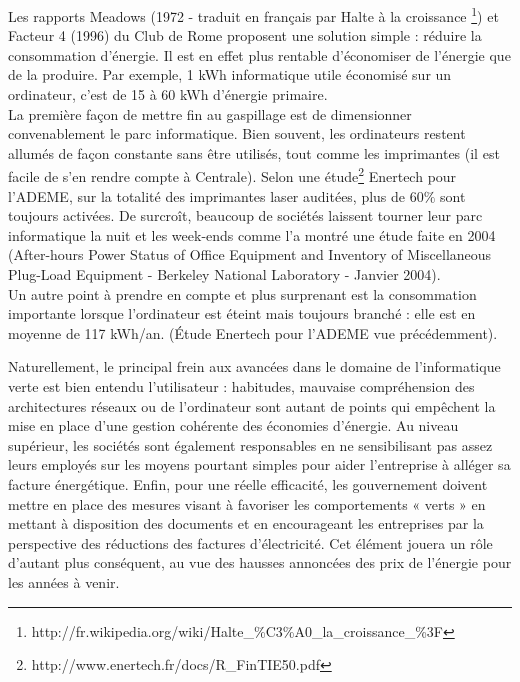 \documentclass[a4paper,11pt,french]{article}
\begin{document}
Les rapports Meadows (1972 - traduit en français par \og Halte à la croissance \fg \footnote{\textsf{http://fr.wikipedia.org/wiki/Halte\_{}\%C3\%A0\_{}la\_{}croissance\_{}\%3F}}) et Facteur 4 (1996) du Club de Rome proposent une solution simple : réduire la consommation d’énergie. Il est en effet plus rentable d’économiser de l’énergie que de la produire. Par exemple, 1 kWh informatique utile économisé sur un ordinateur, c’est de 15 à 60 kWh d’énergie primaire.\\

La première façon de mettre fin au gaspillage est de dimensionner convenablement le parc informatique. Bien souvent, les ordinateurs restent allumés de façon constante sans être utilisés, tout comme les imprimantes (il est facile de s’en rendre compte à Centrale). Selon une étude\footnote{\textsf{http://www.enertech.fr/docs/R\_{}FinTIE50.pdf}} Enertech pour l’ADEME, sur la totalité des imprimantes laser auditées, plus de $60\%$ sont toujours activées. De surcroît, beaucoup de sociétés laissent tourner leur parc informatique la nuit et les week-ends comme l’a montré une étude faite en 2004 (After-hours Power Status of Office Equipment and Inventory of Miscellaneous Plug-Load Equipment - Berkeley National Laboratory - Janvier 2004).\\

Un autre point à prendre en compte et plus surprenant est la consommation importante lorsque l’ordinateur est éteint mais toujours branché : elle est en moyenne de 117 kWh/an. (Étude Enertech pour l’ADEME vue précédemment).

Naturellement, le principal frein aux avancées dans le domaine de l’informatique verte est bien entendu l’utilisateur : habitudes, mauvaise compréhension des architectures réseaux ou de l’ordinateur sont autant de points qui empêchent la mise en place d’une gestion cohérente des économies d’énergie. Au niveau supérieur, les sociétés sont également responsables en ne sensibilisant pas assez leurs employés sur les moyens pourtant simples pour aider l’entreprise à alléger sa facture énergétique. Enfin, pour une réelle efficacité, les gouvernement doivent mettre en place des mesures visant à favoriser les comportements « verts » en mettant à disposition des documents et en encourageant les entreprises par la perspective des réductions des factures d’électricité. Cet élément jouera un rôle d’autant plus conséquent, au vue des hausses annoncées des prix de l’énergie pour les années à venir.\\
\end{document}

